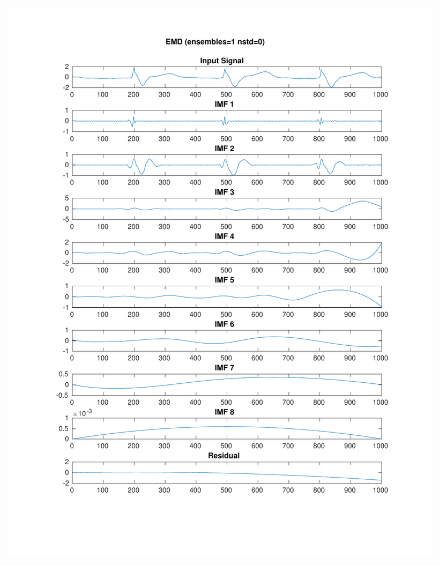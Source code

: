 \documentclass[11pt,a4paper]{article}
\begin{document}
\begin{figure}[H]
\centering
\begin{minipage}{0.48\textwidth}
	\centering
	\includegraphics[width=\textwidth]{fig/217l1_emd.pdf}
	

\end{minipage}
\end{figure}
\end{document}
